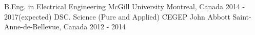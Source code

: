 \begin{cventries}
  \cventry
    {B.Eng. in Electrical Engineering}
    {McGill University}
    {Montreal, Canada}
    {2014 - 2017(expected)}
    {}
    \cventry
    {DSC. Science (Pure and Applied)}
    {CEGEP John Abbott}
    {Saint-Anne-de-Bellevue, Canada}
    {2012 - 2014}
    {}
\end{cventries}
